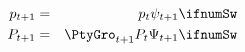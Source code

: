 \begin{eqnarray}
  {{p}}_{t+1} & = & {{p}}_{t} \psi_{t+1}  \label{eq:IndRandWalk}
\ifnumSw \\  {P}_{t+1} & = & \PtyGro_{t+1} {P}_{t}\Psi_{t+1}  \label{eq:AggRandWalk}
\ifnumSw
\end{eqnarray}
